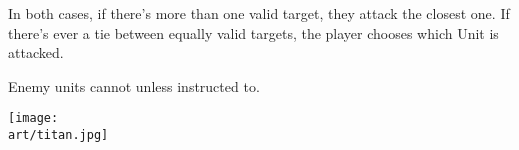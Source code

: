 \begin{multicols}{2}
In both cases, if there's more than one valid target, they attack the closest one.
If there's ever a tie between equally valid targets, the player chooses which Unit is attacked.\par

Enemy units cannot  unless instructed to.

\vfill

\begin{center}
    \texttt{[image: \\art/titan.jpg]}
\end{center}

\end{multicols}
